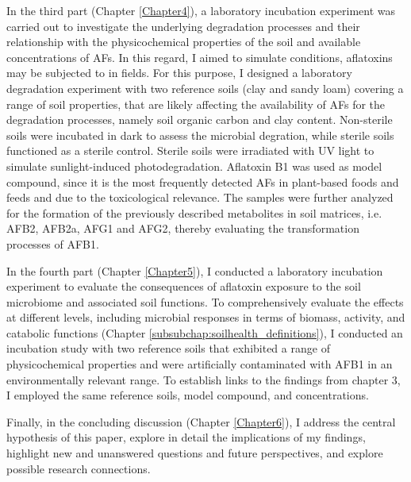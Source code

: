 In the third part (Chapter \ref{Chapter4}), a laboratory incubation experiment was carried out to investigate the underlying degradation processes and their relationship with the physicochemical properties of the soil and available concentrations of AFs. In this regard, I aimed to simulate conditions, aflatoxins may be subjected to in fields. For this purpose, I designed a laboratory degradation experiment with two reference soils (clay and sandy loam) covering a range of soil properties, that are likely affecting the availability of AFs for the degradation processes, namely soil organic carbon and clay content. Non-sterile soils were incubated in dark to assess the microbial degration, while sterile soils functioned as a sterile control. Sterile soils were irradiated with UV light to simulate sunlight-induced photodegradation. Aflatoxin B1 was used as model compound, since it is the most frequently detected AFs in plant-based foods and feeds and due to the toxicological relevance. The samples were further analyzed for the formation of the previously described metabolites in soil matrices, i.e. AFB2, AFB2a, AFG1 and AFG2, thereby evaluating the transformation processes of AFB1.


In the fourth part (Chapter \ref{Chapter5}), I conducted a laboratory incubation experiment to evaluate the consequences of aflatoxin exposure to the soil microbiome and associated soil functions. To comprehensively evaluate the effects at different levels, including microbial responses in terms of biomass, activity, and catabolic functions (Chapter \ref{subsubchap:soilhealth_definitions}), I conducted an incubation study with two reference soils that exhibited a range of physicochemical properties and were artificially contaminated with AFB1 in an environmentally relevant range. To establish links to the findings from chapter 3, I employed the same reference soils, model compound, and concentrations.


Finally, in the concluding discussion (Chapter \ref{Chapter6}), I address the central hypothesis of this paper, explore in detail the implications of my findings, highlight new and unanswered questions and future perspectives, and explore possible research connections.
